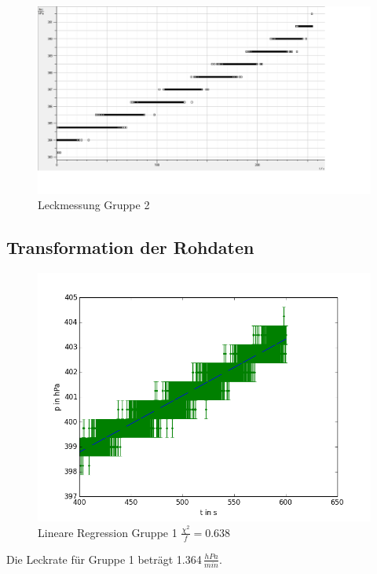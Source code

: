 \documentclass[11pt]{beamer}
\begin{document}
\begin{frame}
\begin{figure}[H]
\centering
\includegraphics[scale=0.3]{Bilder/dichtigkeit_raw_EL.png}
\caption{Leckmessung Gruppe 2}
\end{figure}
\end{frame}

\subsection{Transformation der Rohdaten}
\begin{frame}
\begin{figure}[H]
\centering
\includegraphics[scale=0.5]{Bilder/dichtigkeit__JM.png}
\caption{Lineare Regression Gruppe 1 $\frac{\chi^2}{f}=0.638$}
\end{figure}
Die Leckrate für Gruppe 1 beträgt 1.364$\,\frac{hPa}{min}$.
\end{frame}
\end{document}
